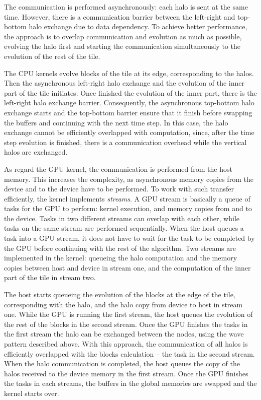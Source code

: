 The communication is performed asynchronously: each halo is sent at the same time. However, there is a communication barrier between the left-right and top-bottom halo exchange due to data dependency. To achieve better performance, the approach is to overlap communication and evolution as much as possible, evolving the halo first and starting the communication simultaneously to the evolution of the rest of the tile. 

The CPU kernels evolve blocks of the tile at its edge, corresponding to the halos. Then the asynchronous left-right halo exchange and the evolution of the inner part of the tile initiates. Once finished the evolution of the inner part, there is the left-right halo exchange barrier. Consequently, the asynchronous top-bottom halo exchange starts and the top-bottom barrier ensure that it finish before swapping the buffers and continuing with the next time step. In this case, the halo exchange cannot be efficiently overlapped with computation, since, after the time step evolution is finished, there is a communication overhead while the vertical halos are exchanged.

As regard the GPU kernel, the communication is performed from the host memory. This increases the complexity, as asynchronous memory copies from the device and to the device have to be performed. To work with such transfer efficiently, the kernel implements \textit{streams}. A GPU stream is basically a queue of tasks for the GPU to perform: kernel execution, and memory copies from and to the device. Tasks in two different streams can overlap with each other, while tasks on the same stream are performed sequentially. When the host queues a task into a GPU stream, it does not have to wait for the task to be completed by the GPU before continuing with the rest of the algorithm. Two streams are implemented in the kernel: queueing the halo computation and the memory copies between host and device in stream one, and the computation of the inner part of the tile in stream two.

The host starts queueing the evolution of the blocks at the edge of the tile, corresponding with the halo, and the halo copy from device to host in stream one. While the GPU is running the first stream, the host queues the evolution of the rest of the blocks in the second stream. Once the GPU finishes the tasks in the first stream the halo can be exchanged between the nodes, using the wave pattern described above. With this approach, the communication of all halos is efficiently overlapped with the blocks calculation -- the task in the second stream. When the halo communication is completed, the host queues the copy of the halos received to the device memory in the first stream. Once the GPU finishes the tasks in each streams, the buffers in the global memories are swapped and the kernel starts over.

